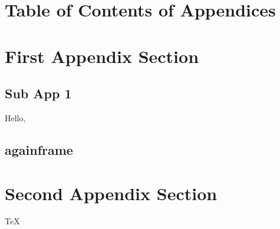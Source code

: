 \appendix



\section*{Table of Contents of Appendices}

\begin{frame}{\secname}
    \tableofcontents[hideallsubsections,firstsection=3]
\end{frame}

\section{First Appendix Section}
\subsection{Sub App 1}

\begin{frame}{\subsecname}
    \alert{Hello,} 
\end{frame}

\subsection{againframe}

\section{Second Appendix Section}
\begin{frame}{\secname}
    \TeX
\end{frame}

